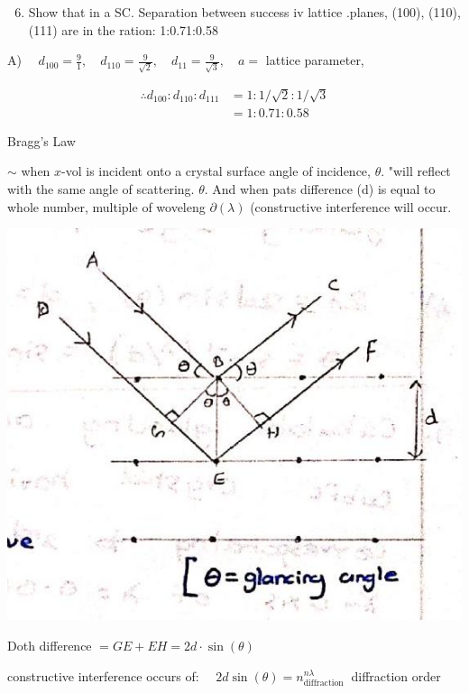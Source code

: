 \documentclass[10pt]{article}
\begin{document}
\begin{enumerate}
  \setcounter{enumi}{5}
  \item Show that in a SC. Separation between success iv lattice .planes, (100), (110), (111) are in the ration: 1:0.71:0.58
\end{enumerate}

A) $\quad d_{100}=\frac{9}{1}, \quad d_{110}=\frac{9}{\sqrt{2}}, \quad d_{11}=\frac{9}{\sqrt{3}}, \quad a=$ lattice parameter,

$$
\begin{aligned}
\therefore d_{100}: d_{110}: d_{111} & =1: 1 / \sqrt{2}: 1 / \sqrt{3} \\
& =1: 0.71: 0.58
\end{aligned}
$$

Bragg's Law

$\sim$ when $x$-vol is incident onto a crystal surface angle of incidence, $\theta$. "will reflect with the same angle of scattering. $\theta$. And when pats difference (d) is equal to whole number, multiple of woveleng $\partial(\lambda)$ (constructive interference will occur.

\begin{center}
\includegraphics[max width=\textwidth]{2024_06_16_30d750483617f1939202g-09}
\end{center}

Doth difference $=G E+E H=2 d \cdot \sin (\theta)$

constructive interference occurs of: $\quad 2 d \sin (\theta)=n_{\text {diffraction }}^{n \lambda}$ diffraction order
\end{document}
